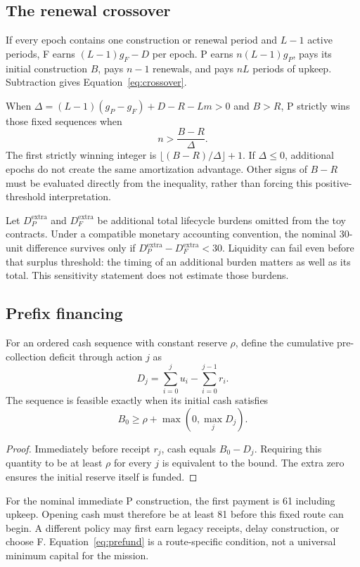 \subsection{The renewal crossover}
If every epoch contains one construction or renewal period and $L-1$ active periods, F earns $(L-1)g_F-D$ per epoch. P earns $n(L-1)g_P$, pays its initial construction $B$, pays $n-1$ renewals, and pays $nL$ periods of upkeep. Subtraction gives Equation~\ref{eq:crossover}.

When $\Delta=(L-1)(g_P-g_F)+D-R-Lm>0$ and $B>R$, P strictly wins those fixed sequences when
\begin{equation}
 n>\frac{B-R}{\Delta}.
\end{equation}
The first strictly winning integer is $\lfloor(B-R)/\Delta\rfloor+1$. If $\Delta\leq0$, additional epochs do not create the same amortization advantage. Other signs of $B-R$ must be evaluated directly from the inequality, rather than forcing this positive-threshold interpretation.

Let $D_P^{\mathrm{extra}}$ and $D_F^{\mathrm{extra}}$ be additional total lifecycle burdens omitted from the toy contracts. Under a compatible monetary accounting convention, the nominal 30-unit difference survives only if $D_P^{\mathrm{extra}}-D_F^{\mathrm{extra}}<30$. Liquidity can fail even before that surplus threshold: the timing of an additional burden matters as well as its total. This sensitivity statement does not estimate those burdens.

\subsection{Prefix financing}
For an ordered cash sequence with constant reserve $\rho$, define the cumulative pre-collection deficit through action $j$ as
\begin{equation}
 D_j=\sum_{i=0}^{j}u_i-\sum_{i=0}^{j-1}r_i.
\end{equation}
The sequence is feasible exactly when its initial cash satisfies
\begin{equation}
 B_0\geq\rho+\max(0,\max_j D_j).
 \label{eq:prefund}
\end{equation}
\begin{proof}
Immediately before receipt $r_j$, cash equals $B_0-D_j$. Requiring this quantity to be at least $\rho$ for every $j$ is equivalent to the bound. The extra zero ensures the initial reserve itself is funded.
\end{proof}
For the nominal immediate P construction, the first payment is 61 including upkeep. Opening cash must therefore be at least 81 before this fixed route can begin. A different policy may first earn legacy receipts, delay construction, or choose F. Equation~\ref{eq:prefund} is a route-specific condition, not a universal minimum capital for the mission.

